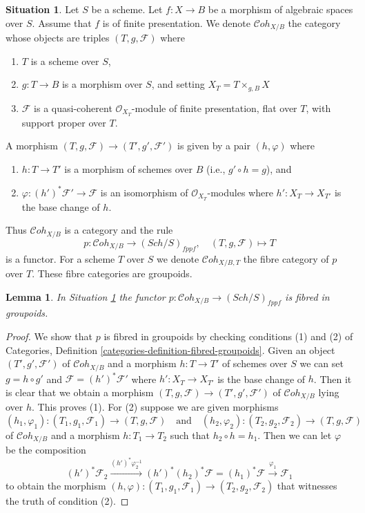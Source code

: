 \documentclass{stacks-project}
\theoremstyle{plain}
\newtheorem{lemma}[subsection]{Lemma}
\theoremstyle{definition}
\newtheorem{situation}[subsection]{Situation}
\theoremstyle{remark}
\numberwithin{equation}{subsection}
\def\Sch{\mathit{Sch}}
\def\Cohstack{\mathcal{C}\!\mathit{oh}}
\begin{document}
\begin{situation}
\label{situation-coherent}
Let $S$ be a scheme. Let $f : X \to B$ be a morphism of algebraic spaces
over $S$. Assume that $f$ is of finite presentation.
We denote $\Cohstack_{X/B}$ the category whose objects are
triples $(T, g, \mathcal{F})$ where
\begin{enumerate}
\item $T$ is a scheme over $S$,
\item $g : T \to B$ is a morphism over $S$, and setting
$X_T = T \times_{g, B} X$
\item $\mathcal{F}$ is a quasi-coherent $\mathcal{O}_{X_T}$-module
of finite presentation, flat over $T$, with support proper over $T$.
\end{enumerate}
A morphism $(T, g, \mathcal{F}) \to (T', g', \mathcal{F}')$
is given by a pair $(h, \varphi)$ where
\begin{enumerate}
\item $h : T \to T'$ is a morphism of schemes over $B$
(i.e., $g' \circ h = g$), and
\item $\varphi : (h')^*\mathcal{F}' \to \mathcal{F}$ is an
isomorphism of $\mathcal{O}_{X_T}$-modules where $h' : X_T \to X_{T'}$
is the base change of $h$.
\end{enumerate}
\end{situation}

\noindent
Thus $\Cohstack_{X/B}$ is a category and the rule
$$
p : \Cohstack_{X/B} \longrightarrow (\Sch/S)_{fppf},
\quad
(T, g, \mathcal{F}) \longmapsto T
$$
is a functor. For a scheme $T$ over $S$ we denote $\Cohstack_{X/B, T}$
the fibre category of $p$ over $T$. These fibre categories are groupoids.

\begin{lemma}
\label{lemma-coherent-fibred-in-groupoids}
In Situation \ref{situation-coherent} the functor
$p : \Cohstack_{X/B} \longrightarrow (\Sch/S)_{fppf}$
is fibred in groupoids.
\end{lemma}

\begin{proof}
We show that $p$ is fibred in groupoids by checking conditions
(1) and (2) of Categories, Definition
\ref{categories-definition-fibred-groupoids}.
Given an object $(T', g', \mathcal{F}')$
of $\Cohstack_{X/B}$ and a morphism $h : T \to T'$ of
schemes over $S$ we can set $g = h \circ g'$ and
$\mathcal{F} = (h')^*\mathcal{F}'$ where $h' : X_T \to X_{T'}$
is the base change of $h$. Then it is clear that we obtain
a morphism $(T, g, \mathcal{F}) \to (T', g', \mathcal{F}')$
of $\Cohstack_{X/B}$ lying over $h$. This proves (1).
For (2) suppose we are given morphisms
$$
(h_1, \varphi_1) : (T_1, g_1, \mathcal{F}_1) \to (T, g, \mathcal{F})
\quad\text{and}\quad
(h_2, \varphi_2) : (T_2, g_2, \mathcal{F}_2) \to (T, g, \mathcal{F})
$$
of $\Cohstack_{X/B}$ and a morphism $h : T_1 \to T_2$ such that
$h_2 \circ h = h_1$. Then we can let $\varphi$ be the composition
$$
(h')^*\mathcal{F}_2
\xrightarrow{(h')^*\varphi_2^{-1}}
(h')^*(h_2)^*\mathcal{F} = (h_1)^*\mathcal{F}
\xrightarrow{\varphi_1}
\mathcal{F}_1
$$
to obtain the morphism
$(h, \varphi) : (T_1, g_1, \mathcal{F}_1) \to (T_2, g_2, \mathcal{F}_2)$
that witnesses the truth of condition (2).
\end{proof}
\end{document}
